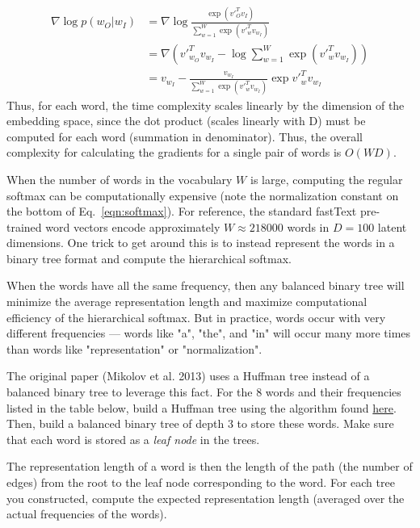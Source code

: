 \begin{solution}
    \begin{align*}
        \nabla \log p(w_O|w_I) &= \nabla \log \frac{\exp(v'^T_O v_I)}{\sum_{w=1}^W \exp(v'^T_w v_{w_I})}\\
        &= \nabla \left( v'^T_{w_O} v_{w_I} - \log \sum_{w=1}^W \exp(v'^T_w v_{w_I}) \right)\\
        &= v_{w_I} - \frac{v_{w_I}}{\sum_{w=1}^W \exp(v'^T_w v_{w_I})} \exp{v'^T_w v_{w_I}}
    \end{align*}
    Thus, for each word, the time complexity scales linearly by the dimension of the embedding space, since the dot product (scales linearly with D) must be computed for each word (summation in denominator). Thus, the overall complexity for calculating the gradients for a single pair of words is $O(WD)$.
\end{solution}

\newpage

\problem[10]
When the number of words in the vocabulary $W$ is large, computing the regular softmax can be computationally expensive (note the normalization constant on the bottom of Eq.~\ref{eqn:softmax}). For reference, the standard fastText pre-trained word vectors encode approximately $W \approx 218000$ words in $D=100$ latent dimensions. One trick to get around this is to instead represent the words in a binary tree format and compute the hierarchical softmax.

When the words have all the same frequency, then any balanced binary tree will minimize the average representation length and maximize computational efficiency of the hierarchical softmax. But in practice, words occur with very different frequencies --- words like "a", "the", and "in" will occur many more times than words like "representation" or "normalization".

The original paper (Mikolov et al. 2013) uses a Huffman tree instead of a balanced binary tree to leverage this fact. For the 8 words and their frequencies listed in the table below, build a Huffman tree using the algorithm found \href{https://riptutorial.com/algorithm/example/23995/huffman-coding}{here}.
Then, build a balanced binary tree of depth 3 to store these words. 
Make sure that each word is stored as a \emph{leaf node} in the trees.

The representation length of a word is then the length of the path (the number of edges) from the root to the leaf node corresponding to the word. For each tree you constructed, compute the expected representation length (averaged over the actual frequencies of the words).

